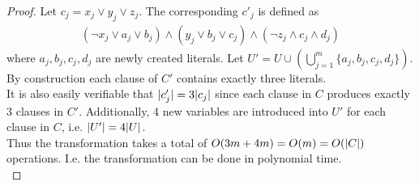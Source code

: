 \documentclass[12pt]{article}
\newenvironment{question}[2][Question]{\begin{trivlist}
\item[\hskip \labelsep {\bfseries #1}\hskip \labelsep {\bfseries #2.}]}{\end{trivlist}}
\DeclarePairedDelimiter\abs{\lvert}{\rvert}%
\begin{document}
\begin{question}{1}
\begin{proof}
    Let $c_{j} = x_{j} \vee y_{j} \vee z_{j}$. The corresponding $c'_{j}$ is
    defined as
    \begin{align*}
      (\neg x_{j} \vee a_{j} \vee b_{j}) \land (y_{j} \vee b_{j} \vee c_{j}) \land (\neg z_{j} \land c_{j} \land d_{j})
    \end{align*}
    where $a_{j}, b_{j}, c_{j}, d_{j}$ are newly created literals.
    Let $U' = U \cup (\bigcup_{j=1}^{m} \{a_{j}, b_{j}, c_{j}, d_{j}\})$. \\

    By construction each clause of $C'$ contains exactly three literals. \\

    It is also easily verifiable that $\abs{c'_{j}} = 3\abs{c_{j}}$ since each
    clause in $C$ produces exactly 3 clauses in $C'$.  Additionally, 4 new variables
    are introduced into $U'$ for each clause in $C$, i.e. $\abs{U'} = 4\abs{U}$. \\

    Thus the transformation takes a total of $O(3m + 4m) = O(m) = O(\abs{C})$ operations.
    I.e. the transformation can be done in polynomial time. \\


\end{proof}
\end{question}
\end{document}
